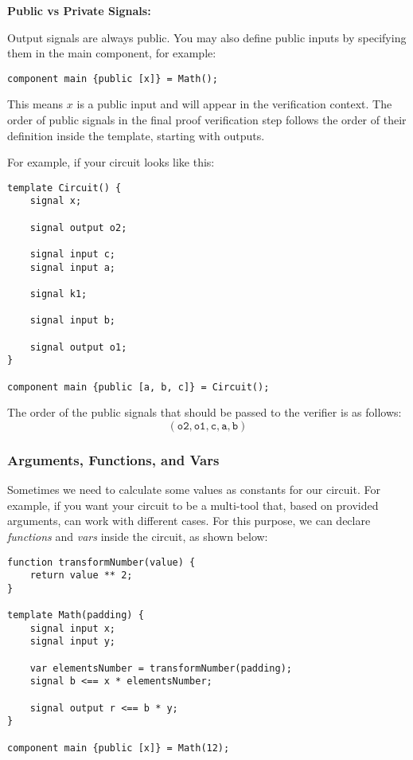 \documentclass[../lecture-notes.tex]{subfiles}
\begin{document}
    \vspace{0.5cm}

    \textbf{Public vs Private Signals:}

    Output signals are always public.
    You may also define public inputs by specifying them in the main component, for example:

    \begin{lstlisting}[language=Circom,numbers=none]
component main {public [x]} = Math();
    \end{lstlisting}

    This means $x$ is a public input and will appear in the verification context.
    The order of public signals in the final proof verification step follows the order of their definition inside the template, starting with outputs.

    \newpage

    For example, if your circuit looks like this:
    \begin{lstlisting}[language=Circom,numbers=none]
template Circuit() {
    signal x;

    signal output o2;

    signal input c;
    signal input a;

    signal k1;

    signal input b;

    signal output o1;
}

component main {public [a, b, c]} = Circuit();
    \end{lstlisting}

    The order of the public signals that should be passed to the verifier is as follows:
    \[ (\texttt{o2}, \texttt{o1}, \texttt{c}, \texttt{a}, \texttt{b}) \]

    \subsubsection{Arguments, Functions, and Vars}

    Sometimes we need to calculate some values as constants for our circuit.
    For example, if you want your circuit to be a multi-tool that, based on provided arguments, can work with different cases.
    For this purpose, we can declare \textit{functions} and \textit{vars} inside the circuit, as shown below:

    \begin{lstlisting}[language=Circom,numbers=none]
function transformNumber(value) {
    return value ** 2;
}

template Math(padding) {
    signal input x;
    signal input y;

    var elementsNumber = transformNumber(padding);
    signal b <== x * elementsNumber;

    signal output r <== b * y;
}

component main {public [x]} = Math(12);
    \end{lstlisting}
\end{document}
